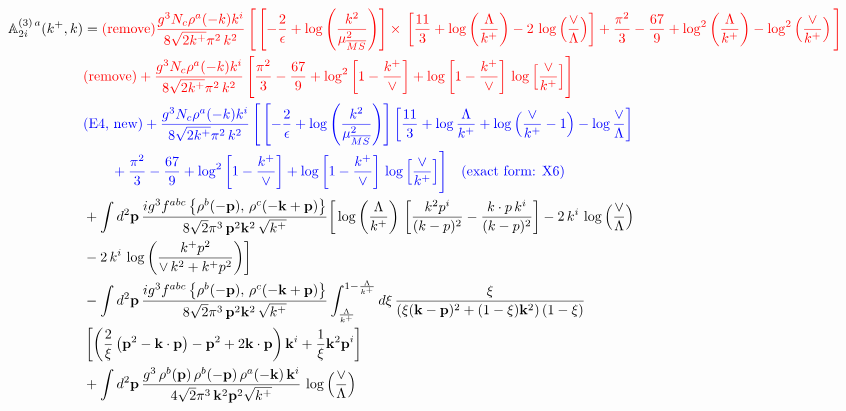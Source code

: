 \documentclass[aps,prd,amsmath,amssymb,nofootinbib]{revtex4-2}
\def\mf#1{\mathbb{#1}}
\numberwithin{equation}{section}
\begin{document}
\begin{align}
     \mf{A}^{(3)\, a}_{2i}(k^{+},k) & = \text{\color{red}(remove)}\color{red}\frac{g^{3}N_{c}\rho^{a}(-k)k^{i}}{8\sqrt{2k^{+}}\pi^{2}\,k^{2}}\,\Bigg[\left[-\frac{2}{\epsilon}+\log{\left(\frac{k^{2}}{\mu^{2}_{\overline{MS}}}\right)}\right]\times\, \left[\frac{11}{3}+\log{\left(\frac{\Lambda}{k^{+}}\right)}-2\,\log{\left(\frac{\vee}{\Lambda}\right)}\right] + \frac{\pi^{2}}{3} - \frac{67}{9} +\log^{2}\left(\frac{\Lambda}{k^{+}}\right)-\log^{2}\left(\frac{\vee}{k^{+}}\right)\Bigg]\notag \\ & \text{\color{red}(remove)}\color{red}+\frac{g^{3}N_{c}\rho^{a}(-k)k^{i}}{8\sqrt{2k^{+}}\pi^{2}\,k^{2}}\, \Bigg[\frac{\pi^{2}}{3} - \frac{67}{9} + \log^{2}{\left[1-\frac{k^{+}}{\vee}\right]}+\log{\left[1-\frac{k^{+}}{\vee}\right]}\,\log{\left[\frac{\vee}{k^{+}}\right]}\Bigg]\notag \\ & \text{\color{blue}(E4, new)}\color{blue}+\frac{g^{3}N_{c}\rho^{a}(-k)k^{i}}{8\sqrt{2k^{+}}\pi^{2}\,k^{2}}\,\Bigg[\left[-\frac{2}{\epsilon}+\log{\left(\frac{k^{2}}{\mu^{2}_{\overline{MS}}}\right)}\right]\left[\frac{11}{3}+\log\frac{\Lambda}{k^{+}}+\log\Big(\frac{\vee}{k^{+}}-1\Big)-\log\frac{\vee}{\Lambda}\right]\notag \\ & \color{blue}\qquad +\frac{\pi^{2}}{3} - \frac{67}{9} + \log^{2}{\left[1-\frac{k^{+}}{\vee}\right]}+\log{\left[1-\frac{k^{+}}{\vee}\right]}\,\log{\left[\frac{\vee}{k^{+}}\right]}\Bigg]\quad\text{\color{blue}(exact form: X6)}\notag \\ & +\int d^{2}\mathbf{p}\,\frac{ig^{3}f^{abc}\left\{ \rho^{b}(-\mathbf{p}),\,\rho^{c}(-\mathbf{k}+\mathbf{p})\right\}}{8\sqrt{2}\pi^{3}\,\mathbf{p}^{2}\mathbf{k}^{2}\,\sqrt{k^{+}}}\bigg[\log{\left(\frac{\Lambda}{k^{+}}\right)}\,\left[\frac{k^{2}p^{i}}{(k-p)^{2}}-\frac{k\cdot p\,k^{i}}{(k-p)^{2}}\right] -2\,k^{i}\,\log{\left(\frac{\vee}{\Lambda}\right)}\notag \\ &  -2\,k^{i}\,\log{\left(\frac{k^{+}p^{2}}{\vee\, k^{2}+k^{+}p^{2}}\right)}\bigg]\notag \\ &   - \int d^{2}\mathbf{p}\,\frac{ig^{3}f^{abc}\left\{ \rho^{b}(-\mathbf{p}),\,\rho^{c}(-\mathbf{k}+\mathbf{p})\right\}}{8\sqrt{2}\pi^{3}\,\mathbf{p}^{2}\mathbf{k}^{2}\,\sqrt{k^{+}}}\int_{\frac{\Lambda}{k^{+}}}^{1-\frac{\Lambda}{k^{+}}}d\xi\,\frac{\xi}{\left(\xi(\mathbf{k}-\mathbf{p})^{2}+(1-\xi)\mathbf{k}^{2}\right)(1-\xi)}\notag \\ & \left[\left(\frac{2}{\xi}\left(\mathbf{p}^{2}-\mathbf{k}\cdot\mathbf{p}\right)-\mathbf{p}^{2}+2\mathbf{k}\cdot\mathbf{p}\right)\mathbf{k}^{i} +\frac{1}{\xi}\mathbf{k}^{2}\mathbf{p}^{i}\right] \notag \\ & +\int d^{2}\mathbf{p}\,\frac{g^{3}\,\rho^{b}(\mathbf{p})\,\rho^{b}(-\mathbf{p})\,\rho^{a}(-\mathbf{k})\, \mathbf{k}^{i}}{4\sqrt{2}\pi^{3}\,\mathbf{k}^{2}\mathbf{p}^{2}\sqrt{k^{+}}}\,\log{\left(\frac{\vee}{\Lambda}\right)} 
\end{align}
\end{document}
